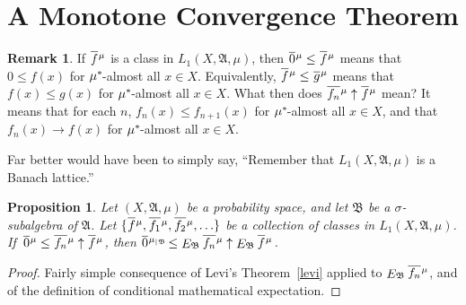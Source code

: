 \documentclass[
twoside=true,
paper=letter,
fontsize=9pt,
pagesize=auto,
leqno,
openany,
headsepline,
overfullrule,
]{scrbook}
\theoremstyle{plain}
\theoremstyle{plain}
\newtheorem{prop}[thm]{Proposition}
\theoremstyle{definition}
\newtheorem{rmk}[thm]{Remark}
\theoremstyle{bfnoteitalic}
\theoremstyle{bfnoteroman}
\newcommand{\sigalg}[1]{\mathfrak{#1}}
\newcommand{\kondexpop}{\mathop{E}}
\newcommand{\textsigma}{\hbox{\large{$\sigma$}}\kern-1pt}
\newcommand{\restrictedto}[1]{_{\lvert#1}\kern-1.5pt}
\newcommand{\sigmaalgebra}{\sigalg{A}}
\newcommand{\sigmaalgebraii}{\sigalg{B}}
\newcommand{\kernast}{\ast\kern-1pt}
\newcommand{\funcf}{f}
\newcommand{\funcg}{g}
\newcommand{\measurespace}{X}
\newcommand{\mspaceelt}{x}
\newcommand{\measmu}{\mu}
\newcommand*\xbar[1]{%
   \hbox{%
     \vbox{%
       \hrule height 0.4pt %
       \kern0.4ex%
       \hbox{%
         \ensuremath{#1}%
       }%
     }%
   }%
}
\newcommand{\lebclass}[1]{\hspace{.5pt}\xbar{#1}\hspace{0.5pt}}
\newcommand{\ellclass}[2]{\lebclass{#1}^{#2}}
\begin{document}
\section{A Monotone Convergence Theorem}
%
\begin{rmk}
If $\ellclass{\funcf}{\measmu}$
is a class in
$L_1(\measurespace, \sigmaalgebra,\measmu)$,
then
$\ellclass{0}{\measmu} \leq \ellclass{\funcf}{\measmu}$
means that
$0 \leq \funcf(\mspaceelt)$ for
$\mu^\kernast$\hyp{}almost
all
$\mspaceelt \in \measurespace$.
Equivalently,
$\ellclass{\funcf}{\measmu} \leq \ellclass{\funcg}{\measmu}$
means that
$\funcf(\mspaceelt) \leq \funcg(\mspaceelt)$ for
$\mu^\kernast$\hyp{}almost
all
$\mspaceelt \in \measurespace$.
What then does
$\ellclass{\funcf_n}{\measmu}
\uparrow
\ellclass{\funcf}{\measmu}$
mean? It means that for each $n$,
$\funcf_n(\mspaceelt) \leq \funcf_{n+1}(\mspaceelt)$ for
$\mu^\kernast$\hyp{}almost
all
$\mspaceelt \in \measurespace$,
and that
$\funcf_n(\mspaceelt) \to \funcf(\mspaceelt)$ for
$\mu^\kernast$\hyp{}almost
all
$\mspaceelt \in \measurespace$.

Far better would have been to simply say,
``Remember that
$L_1(\measurespace, \sigmaalgebra,\measmu)$
is a Banach lattice.''
\end{rmk}




\begin{prop}\label{conditional_monotone}
Let $(\measurespace, \sigmaalgebra,\measmu)$ be a probability space, and let
$\sigmaalgebraii$ be a \textsigma\hyp{}subalgebra of $\sigmaalgebra$.
Let
$\{
\ellclass{\funcf}{\measmu},
\ellclass{\funcf_1}{\measmu},
\ellclass{\funcf_2}{\measmu},
\ldots \}$
be a collection of classes in
$L_1(\measurespace, \sigmaalgebra, \measmu)$.
If\,
$\ellclass{0}{\measmu}
\leq
\ellclass{\funcf_n}{\measmu}
\uparrow
\ellclass{\funcf}{\measmu}$,
then
$\ellclass{0}{\measmu\restrictedto{\sigmaalgebraii}}
\leq
\kondexpop_\sigmaalgebraii \ellclass{\funcf_n}{\measmu}
\uparrow
\kondexpop_\sigmaalgebraii \ellclass{\funcf}{\measmu}$.
\end{prop}

\begin{proof}
Fairly simple consequence of Levi's Theorem~\ref{levi} applied to
$\kondexpop_\sigmaalgebraii \ellclass{\funcf_n}{\measmu}$,
and of the definition of conditional mathematical expectation.
\end{proof}




\end{document}
